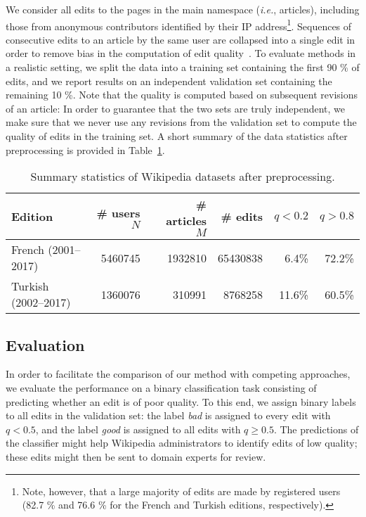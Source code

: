 We consider all edits to the pages in the main namespace (\textit{i.e.}, articles), including those from anonymous contributors identified by their IP address\footnote{%
	Note, however, that a large majority of edits are made by registered users (\num{82.7} \% and \num{76.6} \% for the French and Turkish editions, respectively).}.
Sequences of consecutive edits to an article by the same user are collapsed into a single edit in order to remove bias in the computation of edit quality~\citep{adler2007content}.
To evaluate methods in a realistic setting, we split the data into a training set containing the first \num{90} \% of edits, and we report results on an independent validation set containing the remaining \num{10} \%.
Note that the quality is computed based on subsequent revisions of an article:
In order to guarantee that the two sets are truly independent, we make sure that we never use any revisions from the validation set to compute the quality of edits in the training set.
A short summary of the data statistics after preprocessing is provided in Table~\ref{pps:tab:wikidata}.

\begin{table}
	\centering
	\caption{Summary statistics of Wikipedia datasets after preprocessing.}
	\label{pps:tab:wikidata}
	\begin{tabular}{lrrrrr}
		\toprule
		Edition              & \# users $N$  & \# articles $M$ & \# edits       & $q < 0.2$    & $q > 0.8$    \\
		\midrule
		French  (2001--2017) & \num{5460745} & \num{1932810}   & \num{65430838} & \num{6.4}\%  & \num{72.2}\% \\
		Turkish (2002--2017) & \num{1360076} & \num{310991}    & \num{8768258}  & \num{11.6}\% & \num{60.5}\% \\
		\bottomrule
	\end{tabular}
\end{table}


\subsection{Evaluation}

In order to facilitate the comparison of our method with competing approaches, we evaluate the performance on a binary classification task consisting of predicting whether an edit is of poor quality.
To this end, we assign binary labels to all edits in the validation set: the label \emph{bad} is assigned to every edit with $q < 0.5$, and the label \emph{good} is assigned to all edits with $q \ge 0.5$.
The predictions of the classifier might help Wikipedia administrators to identify edits of low quality;
these edits might then be sent to domain experts for review.

